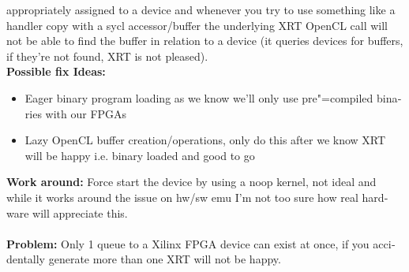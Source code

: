 \begin{otherlanguage}{english}
                                         appropriately assigned to a device and
                                         whenever you try to use something like
                                         a handler copy with a sycl
                                         accessor/buffer the underlying XRT
                                         OpenCL call will not be able to find
                                         the buffer in relation to a device (it
                                         queries devices for buffers, if they're
                                         not found, XRT is not pleased).
                                         \\
                                         \textbf{Possible fix Ideas:}
                                         \begin{itemize}
                                             \item Eager binary program loading
                                                   as we know we'll only use
                                                   pre"=compiled binaries with
                                                   our FPGAs
                                             \item Lazy OpenCL buffer
                                                   creation/operations, only do
                                                   this after we know XRT will
                                                   be happy i.e. binary loaded
                                                   and good to go
                                         \end{itemize}
                                         \textbf{Work around:} Force start the
                                         device by using a noop kernel, not
                                         ideal and while it works around the
                                         issue on hw/sw emu I'm not too sure how
                                         real hardware will appreciate this.
                                         \\
                                         \\
                                         \textbf{Problem:} Only 1 queue to a
                                         Xilinx FPGA device can exist at once,
                                         if you accidentally generate more than
                                         one XRT will not be happy.
                                         \\

\end{otherlanguage}
